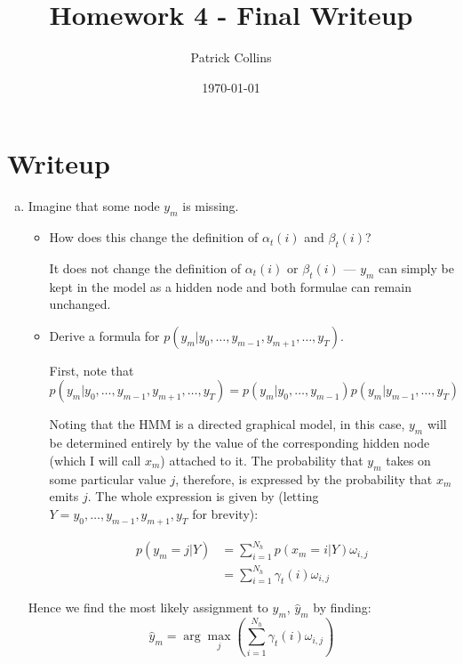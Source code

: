 \documentclass{article}
\begin{document}
\title{Homework 4 - Final Writeup}
\author{Patrick Collins}
\date{\today}
\maketitle

\section{Writeup}

\begin{enumerate}[(a)]

\item Imagine that some node $y_m$ is missing.

\begin{itemize}
\item How does this change the definition of $\alpha_t(i)$ and $\beta_t(i)$?

It does not change the definition of $\alpha_t(i)$ or $\beta_t(i)$ --- $y_m$
can simply be kept in the model as a hidden node and both formulae can
remain unchanged.

\item Derive a formula for $p(y_m | y_0,\dots, y_{m-1},
  y_{m+1},\dots,y_T)$.

First, note that $p(y_m | y_0,\dots, y_{m-1},
  y_{m+1},\dots,y_T) = p(y_m | y_0,\dots, y_{m-1})  p(y_m | y_{m-1},\dots, y_T)$


Noting that the HMM is a directed graphical model, in this case, $y_m$
will be determined entirely by the value of the corresponding hidden
node (which I will call $x_m$) attached to it. The probability that
$y_m$ takes on some particular value $j$, therefore, is expressed by
the probability that $x_m$ emits $j$. The whole expression is given by
(letting $Y = y_0,\dots, y_{m-1}, y_{m+1}, y_T$ for brevity):

\begin{align*}
p(y_m = j |Y) &= \sum \limits_{i=1}^{N_h} p(x_m = i |Y) \omega_{i, j}\\
&= \sum \limits_{i=1}^{N_h} \gamma_t(i)  \omega_{i, j}
\end{align*}
\end{itemize}

Hence we find the most likely assignment to $y_m$, $\hat{y}_m$ by
finding:
\begin{equation*}
\hat{y}_m = \arg\!\max_j(\sum \limits_{i=1}^{N_h} \gamma_t(i)  \omega_{i, j})
\end{equation*}


\end{enumerate}
\end{document}
